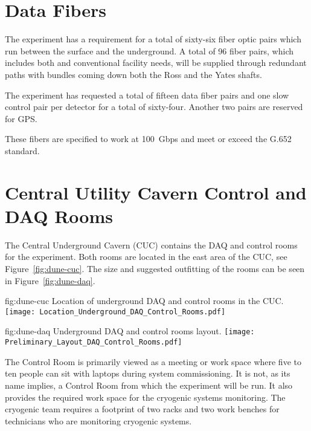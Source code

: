 \section{Data Fibers}
\label{sec:fdsp-coord-faci-fibers}

The  experiment has a requirement for a total of sixty-six fiber
optic pairs which run between the surface and the underground.  A
total of 96 fiber pairs, which includes both  and conventional
facility needs, will be supplied through redundant paths with bundles
coming down both the Ross and the Yates shafts.

The experiment has requested a total of fifteen data fiber pairs and
one slow control pair per detector for a total of sixty-four.  Another
two pairs are reserved for GPS.

These fibers are specified to work at 100~Gbps and meet or exceed the
G.652 standard.

\section{Central Utility Cavern Control and DAQ Rooms}
\label{sec:fdsp-coord-cuc-daq}

The Central Underground Cavern (CUC) contains the DAQ and control
rooms for the  experiment.  Both rooms are located in the east
area of the CUC, see Figure~\ref{fig:dune-cuc}.  The size and
suggested outfitting of the rooms can be seen in
Figure~\ref{fig:dune-daq}.
\begin{dunefigure}{fig:dune-cuc}
  {Location of underground DAQ and control rooms in the CUC.}
  \texttt{[image: Location\_Underground\_DAQ\_Control\_Rooms.pdf]}
\end{dunefigure}
\begin{dunefigure}{fig:dune-daq}
  {Underground DAQ and control rooms layout.}
  \texttt{[image: Preliminary\_Layout\_DAQ\_Control\_Rooms.pdf]}
\end{dunefigure}

The Control Room is primarily viewed as a meeting or work space where
five to ten people can sit with laptops during system commissioning.
It is not, as its name implies, a Control Room from which the
experiment will be run.  It also provides the required work space for
the cryogenic systems monitoring.  The cryogenic team requires a
footprint of two racks and two work benches for technicians who are
monitoring cryogenic systems.
       
